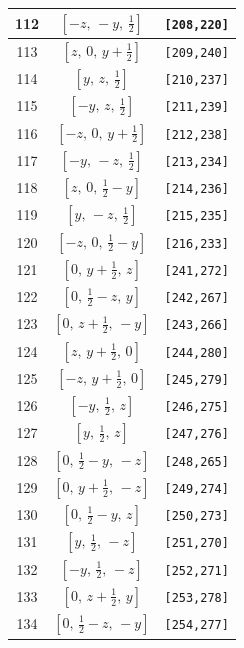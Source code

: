\documentclass[fleqn,8pt]{jsarticle}
\begin{document}
\begin{longtable}{ccc}
112 & $\left[ - z,\, - y,\, \frac{1}{2} \right]$ & {\tt [208,220]} \\ \hline
113 & $\left[ z,\, 0,\, y + \frac{1}{2} \right]$ & {\tt [209,240]} \\ \hline
114 & $\left[ y,\, z,\, \frac{1}{2} \right]$ & {\tt [210,237]} \\ \hline
115 & $\left[ - y,\, z,\, \frac{1}{2} \right]$ & {\tt [211,239]} \\ \hline
116 & $\left[ - z,\, 0,\, y + \frac{1}{2} \right]$ & {\tt [212,238]} \\ \hline
117 & $\left[ - y,\, - z,\, \frac{1}{2} \right]$ & {\tt [213,234]} \\ \hline
118 & $\left[ z,\, 0,\, \frac{1}{2} - y \right]$ & {\tt [214,236]} \\ \hline
119 & $\left[ y,\, - z,\, \frac{1}{2} \right]$ & {\tt [215,235]} \\ \hline
120 & $\left[ - z,\, 0,\, \frac{1}{2} - y \right]$ & {\tt [216,233]} \\ \hline
121 & $\left[ 0,\, y + \frac{1}{2},\, z \right]$ & {\tt [241,272]} \\ \hline
122 & $\left[ 0,\, \frac{1}{2} - z,\, y \right]$ & {\tt [242,267]} \\ \hline
123 & $\left[ 0,\, z + \frac{1}{2},\, - y \right]$ & {\tt [243,266]} \\ \hline
124 & $\left[ z,\, y + \frac{1}{2},\, 0 \right]$ & {\tt [244,280]} \\ \hline
125 & $\left[ - z,\, y + \frac{1}{2},\, 0 \right]$ & {\tt [245,279]} \\ \hline
126 & $\left[ - y,\, \frac{1}{2},\, z \right]$ & {\tt [246,275]} \\ \hline
127 & $\left[ y,\, \frac{1}{2},\, z \right]$ & {\tt [247,276]} \\ \hline
128 & $\left[ 0,\, \frac{1}{2} - y,\, - z \right]$ & {\tt [248,265]} \\ \hline
129 & $\left[ 0,\, y + \frac{1}{2},\, - z \right]$ & {\tt [249,274]} \\ \hline
130 & $\left[ 0,\, \frac{1}{2} - y,\, z \right]$ & {\tt [250,273]} \\ \hline
131 & $\left[ y,\, \frac{1}{2},\, - z \right]$ & {\tt [251,270]} \\ \hline
132 & $\left[ - y,\, \frac{1}{2},\, - z \right]$ & {\tt [252,271]} \\ \hline
133 & $\left[ 0,\, z + \frac{1}{2},\, y \right]$ & {\tt [253,278]} \\ \hline
134 & $\left[ 0,\, \frac{1}{2} - z,\, - y \right]$ & {\tt [254,277]} \\ \hline

\end{longtable}
\end{document}
